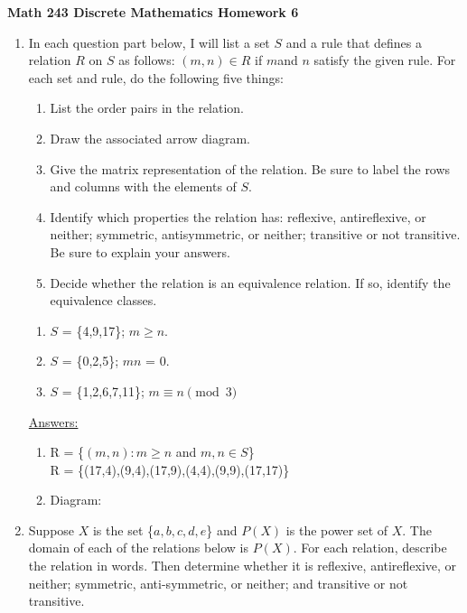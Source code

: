 \documentclass{article}
\newcommand{\R}{\mathbb{R}}
\begin{document}
\noindent\textbf{Math 243 Discrete Mathematics \hfill Homework 6}

\begin{enumerate}
    \item In each question part below, I will list a set $\mathit{S}$ and 
    a rule that defines a relation $\mathit{R}$ on $\mathit{S}$ as follows: 
    $(\mathit{m,n}) \in R$ if $\mathit{m}$and $\mathit{n}$ satisfy the given rule. 
    For each set and rule, do the following five things: 
\begin{enumerate}[label=\bfseries \roman*]
\item List the order pairs in the relation.
\item Draw the associated arrow diagram.
\item Give the matrix representation of the relation. 
Be sure to label the rows and columns with the elements of $S$.
\item Identify which properties the relation has: reflexive, 
antireflexive, or neither; symmetric, antisymmetric, or neither; 
transitive or not transitive. Be sure to explain your answers.
\item Decide whether the relation is an equivalence relation. 
If so, identify the equivalence classes.     
\end{enumerate}

\begin{enumerate}
    \item $\mathit{S}$ = \{4,9,17\}; $m \geq n$.    
    \item $\mathit{S}$ = \{0,2,5\}; $mn$ = 0.
    \item $\mathit{S}$ = \{1,2,6,7,11\}; $m \equiv n \pmod{3}$
\end{enumerate}
\underline{Answers:}

\begin{enumerate}
    \item R = \{$(m,n):m \geq n$ and $m,n \in S$\}\\R = \{(17,4),(9,4),(17,9),(4,4),(9,9),(17,17)\} 
    \\
    \item Diagram:\\
\end{enumerate}

\item Suppose $X$ is the set \{$a,b,c,d,e$\} and $P(X)$ is the power set of $X$. 
The domain of each of the relations below is $P(X)$. 
For each relation, describe the relation in words. Then determine whether it is 
reflexive, antireflexive, or neither; symmetric, anti-symmetric, or neither; and 
transitive or not transitive.


\end{enumerate}
\end{document}
